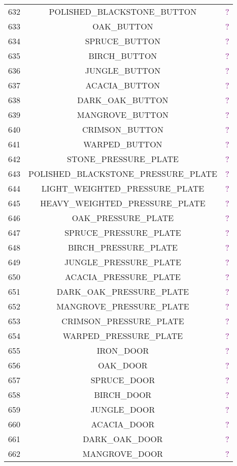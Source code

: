 \documentclass[11pt]{article}
\newcommand\myworries[1]{\textcolor{purple}{#1}}
\begin{document}
\begin{longtable}{ |c|c|c| }
	632 & POLISHED\_BLACKSTONE\_BUTTON & \myworries{?} \\
	633 & OAK\_BUTTON & \myworries{?} \\
	634 & SPRUCE\_BUTTON & \myworries{?} \\
	635 & BIRCH\_BUTTON & \myworries{?} \\
	636 & JUNGLE\_BUTTON & \myworries{?} \\
	637 & ACACIA\_BUTTON & \myworries{?} \\
	638 & DARK\_OAK\_BUTTON & \myworries{?} \\
	639 & MANGROVE\_BUTTON & \myworries{?} \\
	640 & CRIMSON\_BUTTON & \myworries{?} \\
	641 & WARPED\_BUTTON & \myworries{?} \\
	642 & STONE\_PRESSURE\_PLATE & \myworries{?} \\
	643 & POLISHED\_BLACKSTONE\_PRESSURE\_PLATE & \myworries{?} \\
	644 & LIGHT\_WEIGHTED\_PRESSURE\_PLATE & \myworries{?} \\
	645 & HEAVY\_WEIGHTED\_PRESSURE\_PLATE & \myworries{?} \\
	646 & OAK\_PRESSURE\_PLATE & \myworries{?} \\
	647 & SPRUCE\_PRESSURE\_PLATE & \myworries{?} \\
	648 & BIRCH\_PRESSURE\_PLATE & \myworries{?} \\
	649 & JUNGLE\_PRESSURE\_PLATE & \myworries{?} \\
	650 & ACACIA\_PRESSURE\_PLATE & \myworries{?} \\
	651 & DARK\_OAK\_PRESSURE\_PLATE & \myworries{?} \\
	652 & MANGROVE\_PRESSURE\_PLATE & \myworries{?} \\
	653 & CRIMSON\_PRESSURE\_PLATE & \myworries{?} \\
	654 & WARPED\_PRESSURE\_PLATE & \myworries{?} \\
	655 & IRON\_DOOR & \myworries{?} \\
	656 & OAK\_DOOR & \myworries{?} \\
	657 & SPRUCE\_DOOR & \myworries{?} \\
	658 & BIRCH\_DOOR & \myworries{?} \\
	659 & JUNGLE\_DOOR & \myworries{?} \\
	660 & ACACIA\_DOOR & \myworries{?} \\
	661 & DARK\_OAK\_DOOR & \myworries{?} \\
	662 & MANGROVE\_DOOR & \myworries{?} \\

\end{longtable}
\end{document}
